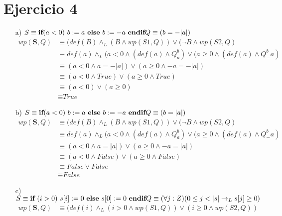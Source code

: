 \documentclass{article}
\begin{document}
{\section*{Ejercicio 4}
\normalsize{\begin{itemize}
    \item [a) ]
    $S\equiv \textbf{if} (a<0)\ b:=a\ \textbf{else}\ b:=-a\ \textbf{endif}\\
    Q\equiv (b=-|a|)$
    \setcounter{equation}{0}
    \begin{align}
        wp(\textbf{S},Q) &\equiv (def(B) \land_L (B \land wp(S1,Q))\lor (\neg B \land wp(S2,Q)\\
        &\equiv def(a)\land_L(a<0 \land (def(a)\land Q^b_a)\lor(a\geq0 \land (def(a)\land Q^b_-a)\\
        &\equiv (a<0 \land a=-|a|)\lor(a\geq0 \land -a=-|a|)\\
        &\equiv (a<0 \land \textit{True})\lor(a\geq0 \land \textit{True})\\
        &\equiv (a<0)\lor(a\geq0)\\
        &\equiv \textit{True}
    \end{align}
    \item [b) ]
    $S\equiv \textbf{if} (a<0)\ b:=a\ \textbf{else}\ b:=-a\ \textbf{endif}\\
    Q\equiv (b=|a|)$
    \setcounter{equation}{0}
    \begin{align}
        wp(\textbf{S},Q) &\equiv (def(B) \land_L (B \land wp(S1,Q))\lor (\neg B \land wp(S2,Q)\\
        &\equiv def(a) \land_L(a<0 \land (def(a)\land Q^b_a)\lor(a\geq0 \land (def(a)\land Q^b_-a)\\
        &\equiv (a<0 \land a=|a|)\lor(a\geq0 \land -a=|a|)\\
        &\equiv (a<0 \land \textit{False})\lor(a\geq0 \land \textit{False})\\
        &\equiv \textit{False}\lor \textit{False}\\
        &\equiv \textit{False}
    \end{align}
    \item [c) ] 
    $S\equiv \textbf{if}\ (i>0)\ s[i]:=0\ \textbf{else}\ s[0]:=0\ \textbf{endif}\\
    Q \equiv (\forall j :Z)(0 \leq j < |s| \to_L s[j] \geq 0)$
    \setcounter{equation}{0}
    \begin{align}
        wp(\textbf{S},Q)&\equiv (def(i)\land_L(i>0 \land wp(S1,Q))\lor (i\geq0 \land wp(S2,Q))\\

\end{align}
\end{itemize}}}
\end{document}
